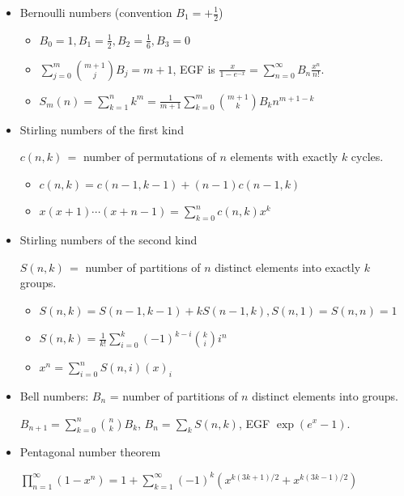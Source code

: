 \begin{itemize}
\item Bernoulli numbers (convention $B_1 = +\frac{1}{2}$)

\begin{itemize}
  \item $B_0=1,B_1=\frac{1}{2},B_2=\frac{1}{6},B_3=0$
  \item $\displaystyle\sum_{j=0}^m\binom{m+1}{j}B_j=m+1$, EGF is $\displaystyle\frac{x}{1 - e^{-x}}=\displaystyle\sum_{n=0}^\infty B_n\frac{x^n}{n!}$.
  \item $S_m(n)=\displaystyle\sum_{k=1}^nk^m=\frac{1}{m+1}\sum_{k=0}^m\binom{m+1}{k}B_kn^{m+1-k}$
\end{itemize}

\item Stirling numbers of the first kind

$c(n, k) \, = $ number of permutations of $n$ elements with exactly $k$ cycles.

\begin{itemize}
  \item $c(n, k) = c(n - 1, k - 1) + (n - 1)c(n - 1, k)$
  \item $x(x + 1)\cdots(x + n - 1) = \sum_{k=0}^{n} c(n, k) x^k$
\end{itemize}

\item Stirling numbers of the second kind

$S(n, k) \, = $ number of partitions of $n$ distinct elements into exactly $k$ groups.

\begin{itemize}
  \item $S(n, k) = S(n - 1, k - 1) + kS(n - 1, k), S(n, 1) = S(n, n) = 1$
  \item $S(n, k) = \frac{1}{k!}\sum_{i=0}^{k}(-1)^{k-i}{k \choose i}i^n$
  \item $x^n     = \sum_{i=0}^{n} S(n, i) (x)_i$
\end{itemize}

\item Bell numbers: $B_n$ = number of partitions of $n$ distinct elements into groups.

$B_{n+1} = \sum_{k=0}^{n} \binom nk B_k$, $B_n = \sum_k S(n, k)$, EGF $\exp(e^x-1)$.

\item Pentagonal number theorem

$\displaystyle\prod_{n=1}^{\infty}(1-x^n)=1+\sum_{k=1}^{\infty}(-1)^k\left(x^{k(3k+1)/2} + x^{k(3k-1)/2}\right)$


\end{itemize}
